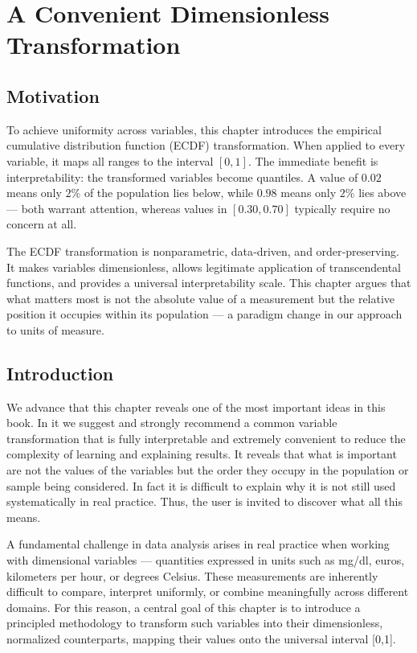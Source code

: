 \startcontents[chapter]
\chapter{A Convenient Dimensionless Transformation}
\label{ch:cdftransformation}
\minitocboxed

\section*{Motivation}
To achieve uniformity across variables, this chapter introduces the empirical cumulative distribution function (ECDF) transformation. When applied to every variable, it maps all ranges to the interval $[0,1]$. The immediate benefit is interpretability: the transformed variables become quantiles. A value of $0.02$ means only $2\%$ of the population lies below, while $0.98$ means only $2\%$ lies above — both warrant attention, whereas values in $[0.30,0.70]$ typically require no concern at all.

The ECDF transformation is nonparametric, data‑driven, and order‑preserving. It makes variables dimensionless, allows legitimate application of transcendental functions, and provides a universal interpretability scale. This chapter argues that what matters most is not the absolute value of a measurement but the relative position it occupies within its population — a paradigm change in our approach to units of measure.

\section{Introduction}
We advance that this chapter reveals one of the most important ideas in this book. In it we suggest and strongly recommend a common variable transformation that is fully interpretable and extremely convenient to reduce the complexity of learning and explaining results. It reveals that what is important are not the values of the variables but the order they occupy in the population or sample being considered. In fact it is difficult to explain why it is not still used systematically in real practice. Thus, the user is invited to discover what all this means.

A fundamental challenge in data analysis arises in real practice when working with dimensional variables — quantities expressed in units such as mg/dl, euros, kilometers per hour, or degrees Celsius. These measurements are inherently difficult to compare, interpret uniformly, or combine meaningfully across different domains. For this reason, a central goal of this chapter is to introduce a principled methodology to transform such variables into their dimensionless, normalized counterparts, mapping their values onto the universal interval [0,1].

